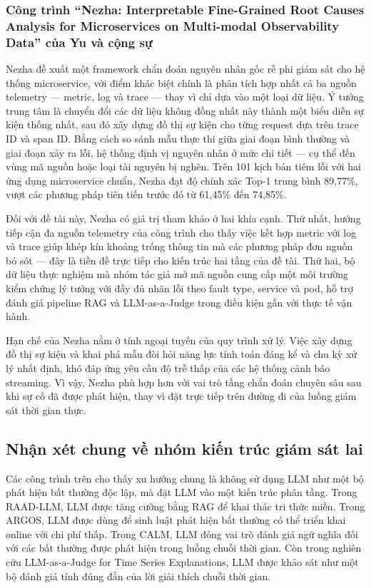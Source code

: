 \subsubsection*{Công trình “Nezha: Interpretable Fine-Grained Root Causes Analysis for Microservices on Multi-modal Observability Data” của Yu và cộng sự}
Nezha đề xuất một framework chẩn đoán nguyên nhân gốc rễ phi giám sát
cho hệ thống microservice, với điểm khác biệt chính là phân tích hợp nhất
cả ba nguồn telemetry — metric, log và trace — thay vì chỉ dựa vào một
loại dữ liệu. Ý tưởng trung tâm là chuyển đổi các dữ liệu không đồng nhất
này thành một biểu diễn sự kiện thống nhất, sau đó xây dựng đồ thị sự kiện
cho từng request dựa trên trace ID và span ID. Bằng cách so sánh mẫu thực
thi giữa giai đoạn bình thường và giai đoạn xảy ra lỗi, hệ thống định vị
nguyên nhân ở mức chi tiết — cụ thể đến vùng mã nguồn hoặc loại tài nguyên
bị nghẽn. Trên 101 kịch bản tiêm lỗi với hai ứng dụng microservice chuẩn,
Nezha đạt độ chính xác Top-1 trung bình 89,77\%, vượt các phương pháp
tiên tiến trước đó từ 61,45\% đến 74,85\%.

Đối với đề tài này, Nezha có giá trị tham khảo ở hai khía cạnh. Thứ nhất,
hướng tiếp cận đa nguồn telemetry của công trình cho thấy việc kết hợp
metric với log và trace giúp khép kín khoảng trống thông tin mà các phương
pháp đơn nguồn bỏ sót — đây là tiền đề trực tiếp cho kiến trúc hai tầng
của đề tài. Thứ hai, bộ dữ liệu thực nghiệm mà nhóm tác giả mở mã nguồn
cung cấp một môi trường kiểm chứng lý tưởng với đầy đủ nhãn lỗi theo
fault type, service và pod, hỗ trợ đánh giá pipeline RAG và LLM-as-a-Judge
trong điều kiện gần với thực tế vận hành.

Hạn chế của Nezha nằm ở tính ngoại tuyến của quy trình xử lý. Việc xây
dựng đồ thị sự kiện và khai phá mẫu đòi hỏi năng lực tính toán đáng kể
và chu kỳ xử lý nhất định, khó đáp ứng yêu cầu độ trễ thấp của các hệ
thống cảnh báo streaming. Vì vậy, Nezha phù hợp hơn với vai trò tầng chẩn
đoán chuyên sâu sau khi sự cố đã được phát hiện, thay vì đặt trực tiếp trên
đường đi của luồng giám sát thời gian thực.


\subsection*{Nhận xét chung về nhóm kiến trúc giám sát lai}

Các công trình trên cho thấy xu hướng chung là không sử dụng LLM như một bộ phát hiện bất thường độc lập, mà đặt LLM vào một kiến trúc phân tầng. Trong RAAD-LLM, LLM được tăng cường bằng RAG để khai thác tri thức miền. Trong ARGOS, LLM được dùng để sinh luật phát hiện bất thường có thể triển khai online với chi phí thấp. Trong CALM, LLM đóng vai trò đánh giá ngữ nghĩa đối với các bất thường được phát hiện trong luồng chuỗi thời gian. Còn trong nghiên cứu LLM-as-a-Judge for Time Series Explanations, LLM được khảo sát như một bộ đánh giá tính đúng đắn của lời giải thích chuỗi thời gian.

